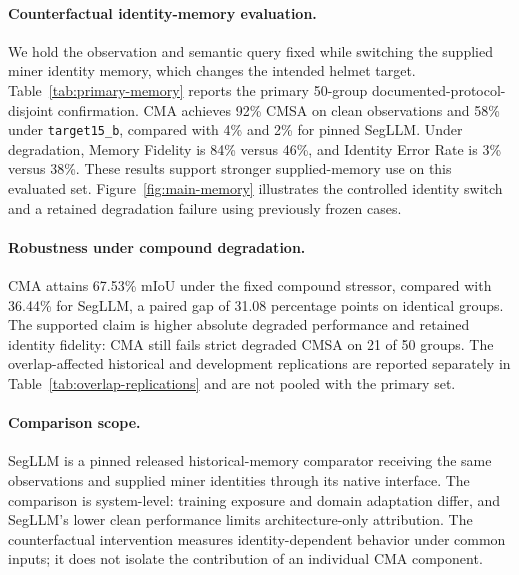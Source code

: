 \paragraph{Counterfactual identity-memory evaluation.}
We hold the observation and semantic query fixed while switching the supplied
miner identity memory, which changes the intended helmet target.
Table~\ref{tab:primary-memory} reports the primary 50-group documented-protocol-disjoint
confirmation. CMA achieves 92\% CMSA on clean observations and 58\% under
\texttt{target15\_b}, compared with 4\% and 2\% for pinned SegLLM.
Under degradation, Memory Fidelity is 84\% versus 46\%, and Identity Error Rate
is 3\% versus 38\%. These results support stronger supplied-memory use on this
evaluated set. Figure~\ref{fig:main-memory} illustrates the controlled identity
switch and a retained degradation failure using previously frozen cases.

\paragraph{Robustness under compound degradation.}
CMA attains 67.53\% mIoU under the fixed compound stressor, compared with
36.44\% for SegLLM, a paired gap of 31.08 percentage points on identical groups.
The supported claim is higher absolute degraded performance and retained identity
fidelity: CMA still fails strict degraded CMSA on 21 of 50 groups.
The overlap-affected historical and development replications are reported
separately in Table~\ref{tab:overlap-replications} and are not pooled with the
primary set.

\paragraph{Comparison scope.}
SegLLM is a pinned released historical-memory comparator receiving the same
observations and supplied miner identities through its native interface.
The comparison is system-level: training exposure and domain adaptation differ,
and SegLLM's lower clean performance limits architecture-only attribution.
The counterfactual intervention measures identity-dependent behavior under common
inputs; it does not isolate the contribution of an individual CMA component.


